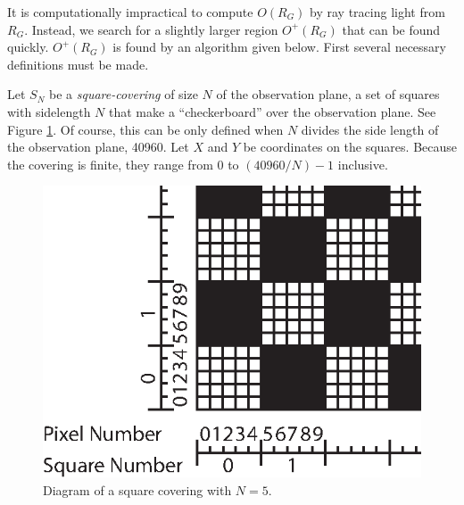 \documentclass[10pt,twoside]{article}
\theoremstyle{definition}
\theoremstyle{exercise}
\begin{document}
It is computationally impractical to compute $O(R_G)$ by ray tracing light from $R_G$. Instead, we search for a slightly larger region $O^+(R_G)$ that can be found quickly. $O^+(R_G)$ is found by an algorithm given below. First several necessary definitions must be made.


Let $S_N$ be a \textit{square-covering} of size $N$ of the observation plane, a set of squares with sidelength $N$ that make a ``checkerboard'' over the observation plane. See Figure \ref{fig:checkerboard}. Of course, this can be only defined when $N$ divides the side length of the observation plane, 40960. Let $X$ and $Y$ be coordinates on the squares. Because the covering is finite, they range from $0$ to $(40960/N)-1$ inclusive.

\begin{figure}[h]
		\begin{center}
				\includegraphics[scale=0.7]{../images/checkerboard.eps}
		\end{center}
		\caption{Diagram of a square covering with $N=5$. }
		\label{fig:checkerboard}
\end{figure}
\end{document}
